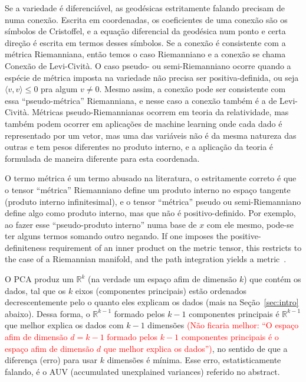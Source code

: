 \documentclass[a4paper,titlepage]{article}
\newcommand{\juliana}[1]{\textcolor{red}{#1}}
\begin{document}
\nocite{wikipedia:geodesic:2021}

Se a variedade é diferenciável, as geodésicas estritamente falando precisam
de numa conexão. Escrita em coordenadas, os coeficientes de uma conexão são os
símbolos de Cristoffel, e a equação diferencial da geodésica num ponto e certa
direção é escrita em termos desses símbolos. Se a conexão é consistente com a métrica
Riemanniana, então temos o caso Riemanniano e a conexão se chama Conexão de
Levi-Cività. O caso pseudo- ou semi-Riemanniano
ocorre quando a espécie de métrica imposta na variedade não precisa ser
positiva-definida, ou seja $\langle v,v\rangle \leq 0$ pra algum $v\neq 0$. Mesmo assim, a conexão
pode ser consistente com essa ``pseudo-métrica'' Riemanniana, e nesse caso
a conexão também é a de Levi-Cività. Métricas pseudo-Riemannianas ocorrem em
teoria da relatividade, mas também podem ocorrer em aplicações de machine
learning onde cada dado é representado por um vetor, mas uma das variáveis não é
da mesma natureza das outras e tem pesos diferentes no produto interno, e a
aplicação da teoria é formulada de maneira diferente para esta coordenada.

\begin{remark}
O termo métrica é um termo abusado na literatura, o estritamente correto é que
o tensor ``métrica'' Riemanniano define um produto interno no espaço tangente
(produto interno infinitesimal), e 
o tensor ``métrica'' pseudo ou semi-Riemanniano define algo como produto
interno, mas que não é positivo-definido. Por exemplo, ao fazer esse
``pseudo-produto interno'' numa base de $x$ com ele mesmo, pode-se ter alguns
termos somando outro negando.
If one imposes the positive-definiteness requirement of an inner product on
the metric tensor, this restricts to the case of a Riemannian manifold, and the
path integration yields a metric~\cite{wikipedia:metric:2021}.
\end{remark}



{
\vspace{1em}
\vspace{1em}
}

O PCA produz um $\mathbb R^k$ (na verdade um espaço afim de dimensão $k$) que
contém os dados, tal que os $k$ eixos (componentes principais) estão ordenados decrescentemente pelo o quanto eles explicam os dados (mais na Seção~\ref{sec:intro} abaixo). Dessa forma, o $\mathbb R^{k-1}$ formado pelos
$k-1$ componentes principais é $\mathbb R^{k-1}$ que melhor explica os dados com
$k-1$ dimensões \juliana{(Não ficaria melhor: ``O espaço afim de dimensão $d=k-1$ formado pelos $k-1$ componentes principais é o espaço afim de dimensão $d$ que melhor explica os dados'')}, no sentido de que a diferença (erro) para usar $k$ dimensões é mínima. Esse erro, estatisticamente falando, é o AUV (accumulated unexplained
variances) referido no abstract. 
\end{document}
